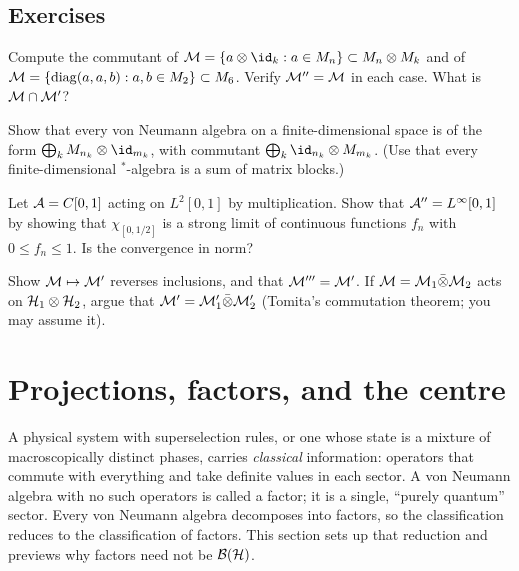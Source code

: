 \subsection*{Exercises}
\begin{exercise}\label{ex:doublecomm:1}
Compute the commutant of $\M=\{a\otimes\id_k:a\in M_n\}\subset M_n\otimes M_k$ and of $\mathcal{M}=\{\mathrm{diag}(a,a,b):a,b\in M_2\}\subset M_6$. Verify $\mathcal{M}''=\mathcal{M}$ in each case. What is $\mathcal{M}\cap\mathcal{M}'$?
\end{exercise}
\begin{exercise}\label{ex:doublecomm:2}
Show that every von Neumann algebra on a finite-dimensional space is of the form $\bigoplus_kM_{n_k}\otimes\id_{m_k}$, with commutant $\bigoplus_k\id_{n_k}\otimes M_{m_k}$. (Use that every finite-dimensional $^*$-algebra is a sum of matrix blocks.)
\end{exercise}
\begin{exercise}\label{ex:doublecomm:3}
Let $\mathcal{A}=C[0,1]$ acting on $L^2[0,1]$ by multiplication. Show that $\mathcal{A}''=L^\infty[0,1]$ by showing that $\chi_{[0,1/2]}$ is a strong limit of continuous functions $f_n$ with $0\le f_n\le1$. Is the convergence in norm?
\end{exercise}
\begin{exercise}\label{ex:doublecomm:4}
Show $\mathcal{M}\mapsto\mathcal{M}'$ reverses inclusions, and that $\mathcal{M}'''=\mathcal{M}'$. If $\mathcal{M}=\mathcal{M}_1\bar\otimes\mathcal{M}_2$ acts on $\mathcal{H}_1\otimes\mathcal{H}_2$, argue that $\mathcal{M}'=\mathcal{M}_1'\bar\otimes\mathcal{M}_2'$ (Tomita's commutation theorem; you may assume it).
\end{exercise}

\section{Projections, factors, and the centre}\label{ch:factors}

\begin{physmotiv}
A physical system with superselection rules, or one whose state is a mixture of macroscopically distinct phases, carries \emph{classical} information: operators that commute with everything and take definite values in each sector. A von Neumann algebra with no such operators is called a factor; it is a single, ``purely quantum'' sector. Every von Neumann algebra decomposes into factors, so the classification reduces to the classification of factors. This section sets up that reduction and previews why factors need not be $\mathcal{B}(\mathcal{H})$.
\end{physmotiv}

